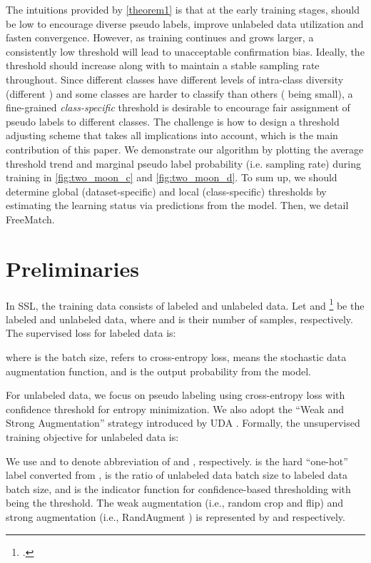 \documentclass{article} \usepackage{iclr2023_conference,times}
\theoremstyle{plain}
\theoremstyle{definition}
\theoremstyle{remark}
\newcommand{\ourmethod}{FreeMatch\xspace}
\begin{document}
The intuitions provided by \cref{theorem1} is that at the early training stages,  should be low to encourage diverse pseudo labels, improve unlabeled data utilization and fasten convergence.
However, as training continues and  grows larger, a consistently low threshold will lead to unacceptable confirmation bias.
Ideally, the threshold  should increase along with  to maintain a stable sampling rate throughout.
Since different classes have different levels of intra-class diversity (different ) and some classes are harder to classify than others ( being small), a fine-grained \emph{class-specific} threshold is desirable to encourage fair assignment of pseudo labels to different classes.
The challenge is how to design a threshold adjusting scheme that takes all implications into account, which is the main contribution of this paper.
We demonstrate our algorithm by plotting the average threshold trend and marginal pseudo label probability (i.e. sampling rate) during training in \cref{fig:two_moon_c} and \ref{fig:two_moon_d}.
To sum up, we should determine global (dataset-specific) and local (class-specific) thresholds by estimating the learning status via predictions from the model.
Then, we detail \ourmethod. 

\section{Preliminaries}
\label{sec-pre}

In SSL, the training data consists of labeled and unlabeled data.
Let  and \footnote{.} be the labeled and unlabeled data, where  and  is their number of samples, respectively. 
The supervised loss for labeled data is:

where  is the batch size,  refers to cross-entropy loss,  means the stochastic data augmentation function, and  is the output probability from the model.

For unlabeled data, we focus on pseudo labeling using cross-entropy loss with confidence threshold for entropy minimization. We also adopt the ``Weak and Strong Augmentation'' strategy introduced by UDA \citep{xie2020unsupervised}. Formally, the unsupervised training objective for unlabeled data is:

We use  and  to denote abbreviation of  and , respectively.  is the hard ``one-hot'' label converted from ,  is the ratio of unlabeled data batch size to labeled data batch size, and  is the indicator function for confidence-based thresholding with  being the threshold.
The weak augmentation (i.e., random crop and flip) and strong augmentation (i.e., RandAugment \cite{cubuk2020randaugment}) is represented by  and  respectively. 
\end{document}
